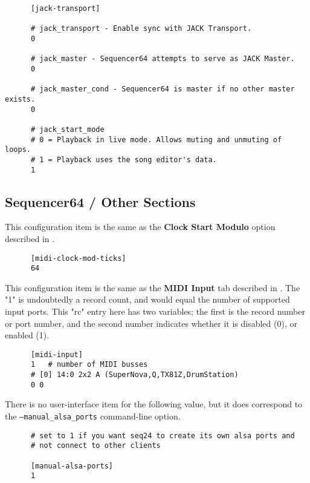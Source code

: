    \begin{verbatim}
      [jack-transport]

      # jack_transport - Enable sync with JACK Transport.
      0

      # jack_master - Sequencer64 attempts to serve as JACK Master.
      0

      # jack_master_cond - Sequencer64 is master if no other master exists.
      0

      # jack_start_mode
      # 0 = Playback in live mode. Allows muting and unmuting of loops.
      # 1 = Playback uses the song editor's data.
      1
   \end{verbatim}

\subsection{Sequencer64 / Other Sections}
\label{subsec:seq64_rc_file_other_midi}

   This configuration item is the same as the
   \textbf{Clock Start Modulo} option described in
   .

   \begin{verbatim}
      [midi-clock-mod-ticks]
      64
   \end{verbatim}

   This configuration item is the same as the 
   \textbf{MIDI Input} tab described in
   .
   The "1" is undoubtedly a record count, and would equal the number of
   supported input ports.
   This "rc" entry here has two variables; the first is the record number or
   port number, and the second number indicates whether it is disabled (0),
   or enabled (1).

   \begin{verbatim}
      [midi-input]
      1   # number of MIDI busses
      # [0] 14:0 2x2 A (SuperNova,Q,TX81Z,DrumStation)
      0 0
   \end{verbatim}

   There is no user-interface item for the following value, but
   it does correspond to the \texttt{--manual\_alsa\_ports} command-line
   option.

   \begin{verbatim}
      # set to 1 if you want seq24 to create its own alsa ports and
      # not connect to other clients

      [manual-alsa-ports]
      1
   \end{verbatim}

